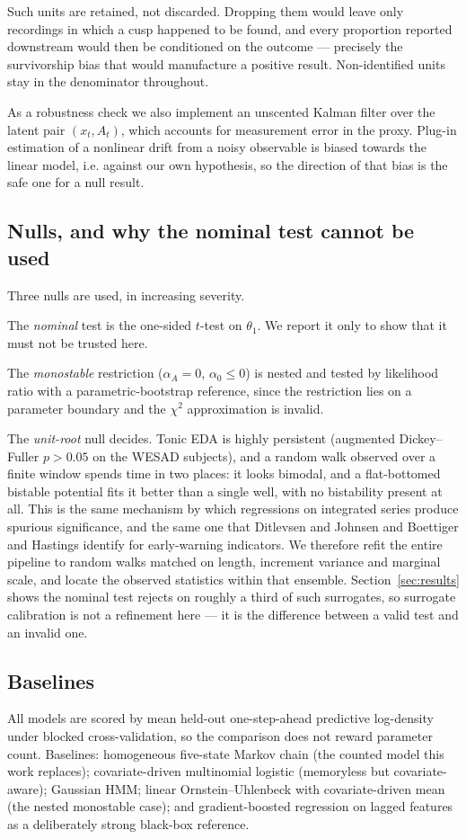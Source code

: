 \documentclass[conference]{IEEEtran}
\begin{document}
Such units are retained, not discarded. Dropping them would leave only
recordings in which a cusp happened to be found, and every proportion reported
downstream would then be conditioned on the outcome --- precisely the
survivorship bias that would manufacture a positive result. Non-identified
units stay in the denominator throughout.

As a robustness check we also implement an unscented Kalman filter
\cite{julier2004} over the latent pair $(x_t,A_t)$, which accounts for
measurement error in the proxy. Plug-in estimation of a nonlinear drift from a
noisy observable is biased towards the linear model, i.e. against our own
hypothesis, so the direction of that bias is the safe one for a null result.

\subsection{Nulls, and why the nominal test cannot be used}
\label{sec:nulls}
Three nulls are used, in increasing severity.

The \emph{nominal} test is the one-sided $t$-test on $\theta_1$. We report it
only to show that it must not be trusted here.

The \emph{monostable} restriction ($\alpha_A=0$, $\alpha_0\le0$) is nested and
tested by likelihood ratio with a parametric-bootstrap reference, since the
restriction lies on a parameter boundary and the $\chi^2$ approximation is
invalid.

The \emph{unit-root} null decides. Tonic EDA is highly persistent (augmented
Dickey--Fuller $p>0.05$ on the WESAD subjects), and a random walk observed over
a finite window spends time in two places: it looks bimodal, and a
flat-bottomed bistable potential fits it better than a single well, with no
bistability present at all. This is the same mechanism by which regressions on
integrated series produce spurious significance, and the same one that
Ditlevsen and Johnsen \cite{ditlevsen2010} and Boettiger and Hastings
\cite{boettiger2012} identify for early-warning indicators. We therefore refit
the entire pipeline to random walks matched on length, increment variance and
marginal scale, and locate the observed statistics within that ensemble.
Section~\ref{sec:results} shows the nominal test rejects on roughly a third of
such surrogates, so surrogate calibration is not a refinement here --- it is
the difference between a valid test and an invalid one.

\subsection{Baselines}
All models are scored by mean held-out one-step-ahead predictive log-density
under blocked cross-validation, so the comparison does not reward parameter
count. Baselines: homogeneous five-state Markov chain (the counted model this
work replaces); covariate-driven multinomial logistic (memoryless but
covariate-aware); Gaussian HMM; linear Ornstein--Uhlenbeck with covariate-driven
mean (the nested monostable case); and gradient-boosted regression on lagged
features as a deliberately strong black-box reference.
\end{document}
